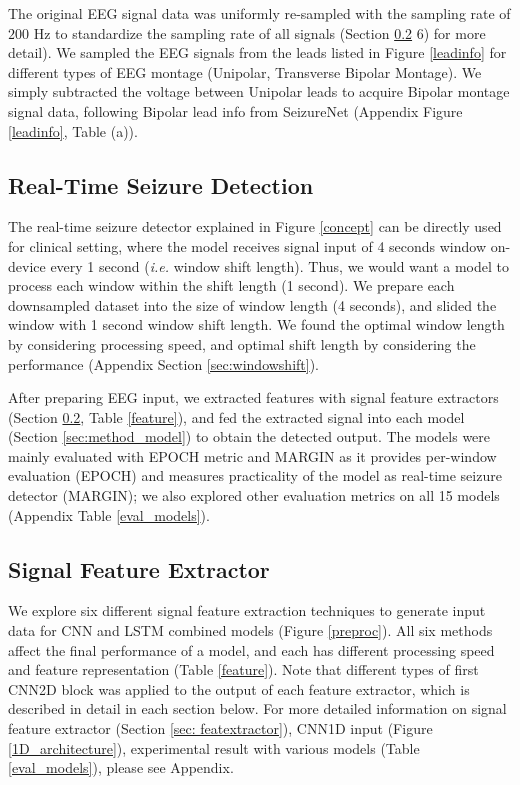 \documentclass[pmlr,twocolumn,10pt]{jmlr}
\begin{document}
The original EEG signal data was uniformly re-sampled with the sampling rate of $200$ Hz to standardize the sampling rate of all signals (Section \ref{sec:method_featext} 6) for more detail). We sampled the EEG signals from the leads listed in Figure \ref{leadinfo} for different types of EEG montage (Unipolar, Transverse Bipolar Montage). We simply subtracted the voltage between Unipolar leads to acquire Bipolar montage signal data, following Bipolar lead info from SeizureNet \citep{asif2020seizurenet} (Appendix Figure \ref{leadinfo}, Table (a)).

\subsection{Real-Time Seizure Detection}


The real-time seizure detector explained in Figure \ref{concept} can be directly used for clinical setting, where the model receives signal input of 4 seconds window on-device every 1 second (\textit{i.e.} window shift length). Thus, we would want a model to process each window within the shift length (1 second). We prepare each downsampled dataset into the size of window length (4 seconds), and slided the window with 1 second window shift length. We found the optimal window length by considering processing speed, and optimal shift length by considering the performance (Appendix Section \ref{sec:windowshift}).

After preparing EEG input, we extracted features with signal feature extractors (Section \ref{sec:method_featext}, Table \ref{feature}), and fed the extracted signal into each model (Section \ref{sec:method_model}) to obtain the detected output. 
The models were mainly evaluated with EPOCH metric and MARGIN as it provides per-window evaluation (EPOCH) and measures practicality of the model as real-time seizure detector (MARGIN); we also explored other evaluation metrics on all 15 models (Appendix Table \ref{eval_models}).

\subsection{Signal Feature Extractor}
\label{sec:method_featext}
We explore six different signal feature extraction techniques to generate input data for CNN and LSTM combined models (Figure \ref{preproc}). All six methods affect the final performance of a model, and each has different processing speed and feature representation (Table \ref{feature}).
Note that different types of first CNN2D block was applied to the output of each feature extractor, which is described in detail in each section below. For more detailed information on signal feature extractor (Section \ref{sec: featextractor}), CNN1D input (Figure \ref{1D_architecture}), experimental result with various models (Table \ref{eval_models}), please see Appendix.
\end{document}
